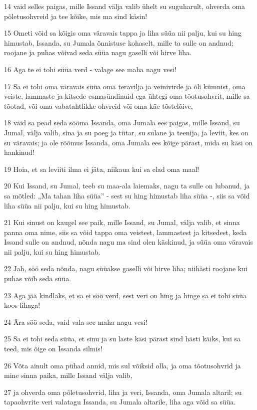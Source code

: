\par 14 vaid selles paigas, mille Issand välja valib ühelt su suguharult, ohverda oma põletusohvreid ja tee kõike, mis ma sind käsin!
\par 15 Ometi võid sa kõigis oma väravais tappa ja liha süüa nii palju, kui su hing himustab, Issanda, su Jumala õnnistuse kohaselt, mille ta sulle on andnud; roojane ja puhas võivad seda süüa nagu gaselli või hirve liha.
\par 16 Aga te ei tohi süüa verd - valage see maha nagu vesi!
\par 17 Sa ei tohi oma väravais süüa oma teravilja ja veinivirde ja õli kümnist, oma veiste, lammaste ja kitsede esmasündinuid ega ühtegi oma tõotusohvrit, mille sa tõotad, või oma vabatahtlikke ohvreid või oma käe tõstelõive,
\par 18 vaid sa pead seda sööma Issanda, oma Jumala ees paigas, mille Issand, su Jumal, välja valib, sina ja su poeg ja tütar, su sulane ja teenija, ja leviit, kes on su väravais; ja ole rõõmus Issanda, oma Jumala ees kõige pärast, mida su käsi on hankinud!
\par 19 Hoia, et sa leviiti ilma ei jäta, niikaua kui sa elad oma maal!
\par 20 Kui Issand, su Jumal, teeb su maa-ala laiemaks, nagu ta sulle on lubanud, ja sa mõtled: „Ma tahan liha süüa” - sest su hing himustab liha süüa -, siis sa võid liha süüa nii palju, kui su hing himustab.
\par 21 Kui sinust on kaugel see paik, mille Issand, su Jumal, välja valib, et sinna panna oma nime, siis sa võid tappa oma veistest, lammastest ja kitsedest, keda Issand sulle on andnud, nõnda nagu ma sind olen käskinud, ja süüa oma väravais nii palju, kui su hing himustab.
\par 22 Jah, söö seda nõnda, nagu süüakse gaselli või hirve liha; niihästi roojane kui puhas võib seda süüa.
\par 23 Aga jää kindlaks, et sa ei söö verd, sest veri on hing ja hinge sa ei tohi süüa koos lihaga!
\par 24 Ära söö seda, vaid vala see maha nagu vesi!
\par 25 Sa ei tohi seda süüa, et sinu ja su laste käsi pärast sind hästi käiks, kui sa teed, mis õige on Issanda silmis!
\par 26 Võta ainult oma pühad annid, mis sul võiksid olla, ja oma tõotusohvrid ja mine sinna paika, mille Issand välja valib,
\par 27 ja ohverda oma põletusohvrid, liha ja veri, Issanda, oma Jumala altaril; su tapaohvrite veri valatagu Issanda, su Jumala altarile, liha aga võid sa süüa.
